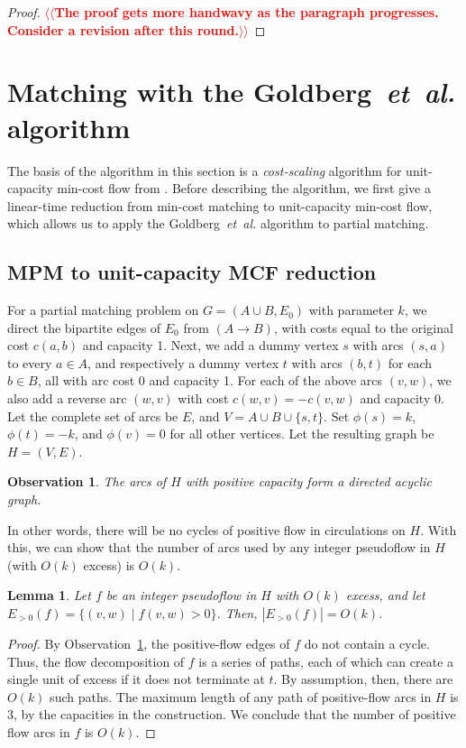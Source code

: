\documentclass[11pt]{article}
\makeatletter
\def\etal{\textsl{et~al.}}
\def\fsupply{\phi}
\theoremstyle{plain}
\newtheorem{lemma}{Lemma}
\newtheorem{observation}{Observation}
\def\n@te#1{\textsf{\boldmath \textbf{$\langle\!\langle$#1$\rangle\!\rangle$}}\leavevmode}
\def\note#1{\textcolor{red}{\n@te{#1}}}
\makeatother
\begin{document}
\begin{figure*}
\begin{proof}
\note{The proof gets more handwavy as the paragraph progresses.  Consider a revision after this round.}
\end{proof}


\section{Matching with the Goldberg~{\etal} algorithm}
\label{section:goldberg}

The basis of the algorithm in this section is a \emph{cost-scaling} algorithm
for unit-capacity min-cost flow from \cite{GHKT17}.
Before describing the algorithm, we first give a linear-time reduction from
min-cost matching to unit-capacity min-cost flow, which allows us to apply the
Goldberg~{\etal} algorithm to partial matching.

\subsection{MPM to unit-capacity MCF reduction}
\label{subsection:mcm_mcf_reduction}

For a partial matching problem on $G = (A \cup B, E_0)$ with parameter $k$, we
direct the bipartite edges of $E_0$ from $(A \to B)$, with costs equal to the
original cost $c(a, b)$ and capacity 1.
Next, we add a dummy vertex $s$ with arcs $(s, a)$ to every $a \in A$,
and respectively a dummy vertex $t$ with arcs $(b, t)$ for each $b \in B$,
all with arc cost 0 and capacity 1.
For each of the above arcs $(v, w)$, we also add a reverse arc $(w, v)$ with
cost $c(w, v) = -c(v, w)$ and capacity 0.
Let the complete set of arcs be $E$, and $V = A \cup B \cup \{s, t\}$.
Set $\fsupply(s) = k$, $\fsupply(t) = -k$, and $\fsupply(v) = 0$ for all other
vertices.
Let the resulting graph be $H = (V, E)$.

\begin{observation}
\label{observation:dag}
	The arcs of $H$ with positive capacity form a directed acyclic graph.
\end{observation}

In other words, there will be no cycles of positive flow in circulations on
$H$.
With this, we can show that the number of arcs used by any integer pseudoflow
in $H$ (with $O(k)$ excess) is $O(k)$.

\begin{lemma}
\label{lemma:reduction_count}
	Let $f$ be an integer pseudoflow in $H$ with $O(k)$ excess, and let
	$E_{>0}(f) = \{(v, w) \mid f(v, w) > 0\}$.
	Then, $|E_{>0}(f)| = O(k)$.
\end{lemma}
\begin{proof}
	By Observation~\ref{observation:dag}, the positive-flow edges of $f$
	do not contain a cycle.
	Thus, the flow decomposition of $f$ is a series of paths, each of which
	can create a single unit of excess if it does not terminate at $t$.
	By assumption, then, there are $O(k)$ such paths.
	The maximum length of any path of positive-flow arcs in $H$ is 3,
	by the capacities in the construction.
	We conclude that the number of positive flow arcs in $f$ is $O(k)$.
\end{proof}


\end{figure*}
\end{document}
